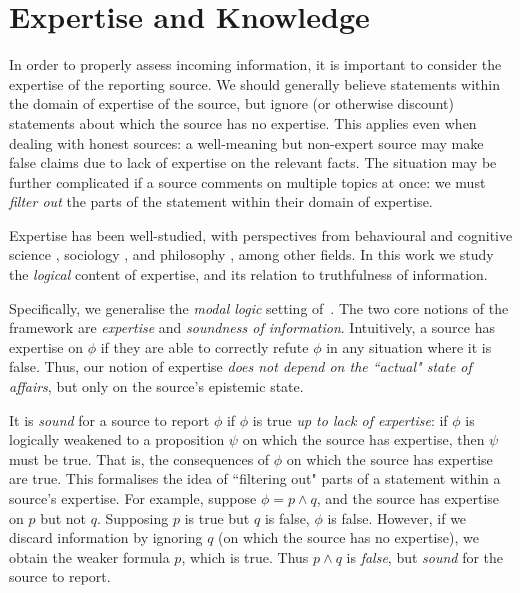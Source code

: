 \chapter{Expertise and Knowledge}


In order to properly assess incoming information, it is important to consider
the expertise of the reporting source. We should generally believe statements
within the domain of expertise of the source, but ignore (or otherwise
discount) statements about which the source has no expertise. This applies even
when dealing with honest sources: a well-meaning but non-expert source may make
false claims due to lack of expertise on the relevant facts.
%
The situation may be further complicated if a source comments on multiple
topics at once: we must \emph{filter out} the parts of the statement within
their domain of expertise.

Expertise has been well-studied, with perspectives from behavioural and
cognitive science \cite{chi2014nature,ericsson2010expertise}, sociology
\cite{collins2008rethinking}, and philosophy
\cite{kilov2021brittleness,whyte2010trust,goldman2018expertise}, among other
fields. In this work we study the \emph{logical} content of expertise, and its
relation to truthfulness of information.

Specifically, we generalise the \emph{modal logic} setting
of~\textcite{singleton2021logic}. The two core notions of the framework are
\emph{expertise} and \emph{soundness of information}. Intuitively, a source has
expertise on $\phi$ if they are able to correctly refute $\phi$ in any
situation where it is false.\footnotemark{} Thus, our notion of expertise
\emph{does not depend on the ``actual" state of affairs}, but only on the
source's epistemic state.


It is \emph{sound} for a source to report $\phi$ if $\phi$ is true \emph{up to
lack of expertise}: if $\phi$ is logically weakened to a proposition $\psi$ on
which the source has expertise, then $\psi$ must be true. That is, the
consequences of $\phi$ on which the source has expertise are true.
%
This formalises the idea of ``filtering out" parts of a statement within a
source's expertise. For example, suppose $\phi = p \land q$, and the source has
expertise on $p$ but not $q$. Supposing $p$ is true but $q$ is false, $\phi$ is
false. However, if we discard information by ignoring $q$ (on which the source
has no expertise), we obtain the weaker formula $p$, which is true. Thus $p
\land q$ is \emph{false}, but \emph{sound} for the source to report.

